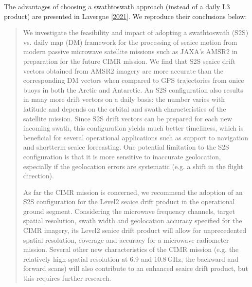 \documentclass[letterpaper,10pt,english]{jupyterBook}
\begin{document}
\sphinxAtStartPar
The advantages of choosing a swath\sphinxhyphen{}to\sphinxhyphen{}swath approach (instead of a daily L3 product) are presented in Lavergne  {[}\hyperlink{cite.references:id20}{2021}{]}. We reproduce their conclusions below:
\begin{quote}

\sphinxAtStartPar
We investigate the feasibility and impact of adopting a swath\sphinxhyphen{}to\sphinxhyphen{}swath (S2S) vs. daily map (DM) framework for the processing of sea\sphinxhyphen{}ice motion from modern passive microwave satellite missions such as JAXA’s AMSR2 in preparation for the future CIMR mission. We find that S2S sea\sphinxhyphen{}ice drift vectors obtained from AMSR2 imagery are more accurate than the corresponding DM vectors when compared to GPS trajectories from on\sphinxhyphen{}ice buoys in both the Arctic and Antarctic. An S2S configuration also results in many more drift vectors on a daily basis: the number varies with latitude and depends on the orbital and swath characteristics of the satellite mission. Since S2S drift vectors can be prepared for each new incoming swath, this configuration yields much better timeliness, which is beneficial for several operational applications such as support to navigation and short\sphinxhyphen{}term sea\sphinxhyphen{}ice forecasting. One potential limitation to the S2S configuration is that it is more sensitive to inaccurate geolocation, especially if the geolocation errors are systematic (e.g. a shift in the flight direction).

\sphinxAtStartPar
As far the CIMR mission is concerned, we recommend the adoption of an S2S configuration for the Level\sphinxhyphen{}2 sea\sphinxhyphen{}ice drift product in the operational ground segment. Considering the microwave frequency channels, target spatial resolution, swath width and geolocation accuracy specified for the CIMR imagery, its Level\sphinxhyphen{}2 sea\sphinxhyphen{}ice drift product will allow for unprecedented spatial resolution, coverage and accuracy for a microwave radiometer mission. Several other new characteristics of the CIMR mission (e.g. the relatively high spatial resolution at 6.9 and 10.8 GHz, the backward and forward scans) will also contribute to an enhanced sea\sphinxhyphen{}ice drift product, but this requires further research.
\end{quote}

\sphinxstepscope
\end{document}
